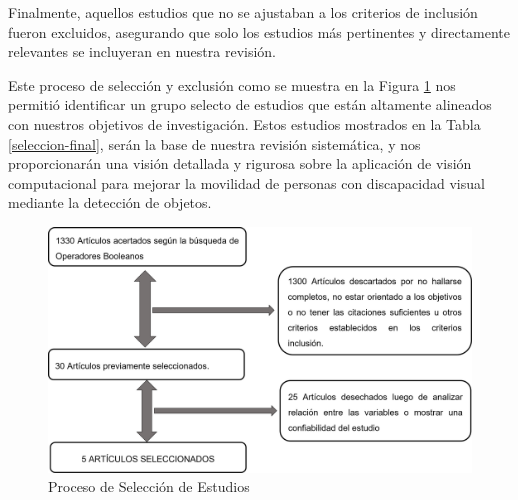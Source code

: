 \documentclass[letterpaper]{article}
\begin{document}
Finalmente, aquellos estudios que no se ajustaban a los criterios de inclusión fueron excluidos, asegurando que solo los estudios más pertinentes y directamente relevantes se incluyeran en nuestra revisión.

Este proceso de selección y exclusión como se muestra en la Figura \ref{proceso} nos permitió identificar un grupo selecto de estudios que están altamente alineados con nuestros objetivos de investigación. Estos estudios mostrados en la Tabla \ref{seleccion-final}, serán la base de nuestra revisión sistemática, y nos proporcionarán una visión detallada y rigurosa sobre la aplicación de visión computacional para mejorar la movilidad de personas con discapacidad visual mediante la detección de objetos.

\begin{figure}[hbtp]
    		\centering
    		\includegraphics[width=1\columnwidth]{graficos/proceso-seleccion.png}
    		\caption{Proceso de Selección de Estudios}
    		\label{proceso}
    \end{figure}
    
\begin{table}[hbtp]
    \centering
    \caption{Resultados por categoría en diferentes bases de datos.}
    \label{seleccion-final}
\end{table}
\end{document}
